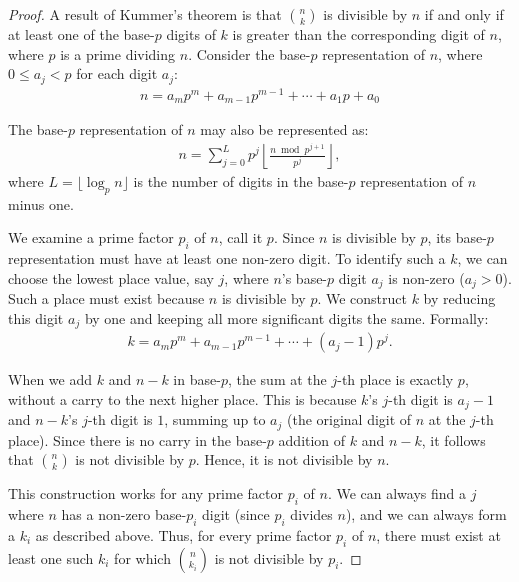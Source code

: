 \documentclass{article}
\theoremstyle{plain}
\theoremstyle{definition}
\begin{document}
\begin{proof}
A result of Kummer's theorem is that \( \binom{n}{k} \) is divisible by \( n \) if and only if at least one of the base-\( p \) digits of \( k \) is greater than the corresponding digit of \( n \), where \( p \) is a prime dividing \( n \). Consider the base-$p$ representation of $n$, where $0 \leq a_j < p$ for each digit $a_j$:
\begin{align}
    n = a_m p^m + a_{m-1} p^{m-1} + \cdots + a_1 p + a_0
\end{align}

The base-$p$ representation of $n$ may also be represented as:
\begin{align}
n = \sum_{j=0}^{L} p^{j} \left\lfloor\frac{n \bmod p^{j+1}}{p^{j}}\right\rfloor,
\end{align}
where \( L = \lfloor \log_p{n} \rfloor \) is the number of digits in the base-\( p \) representation of \( n \) minus one.

We examine a prime factor $p_i$ of $n$, call it $p$. Since $n$ is divisible by $p$, its base-$p$ representation must have at least one non-zero digit. To identify such a $k$, we can choose the lowest place value, say $j$, where $n$'s base-$p$ digit $a_j$ is non-zero ($a_j > 0$). Such a place must exist because $n$ is divisible by $p$. We construct $k$ by reducing this digit $a_j$ by one and keeping all more significant digits the same. Formally:
\begin{align}
    k = a_m p^m + a_{m-1} p^{m-1} + \cdots + (a_j - 1) p^j.
\end{align}

When we add $k$ and $n-k$ in base-$p$, the sum at the $j$-th place is exactly $p$, without a carry to the next higher place. This is because $k$'s $j$-th digit is $a_j - 1$ and $n-k$'s $j$-th digit is $1$, summing up to $a_j$ (the original digit of $n$ at the $j$-th place). Since there is no carry in the base-$p$ addition of $k$ and $n-k$, it follows that $\binom{n}{k}$ is not divisible by $p$. Hence, it is not divisible by $n$.

This construction works for any prime factor $p_i$ of $n$. We can always find a $j$ where $n$ has a non-zero base-$p_i$ digit (since $p_i$ divides $n$), and we can always form a $k_i$ as described above. Thus, for every prime factor $p_i$ of $n$, there must exist at least one such $k_i$ for which $\binom{n}{k_i}$ is not divisible by $p_i$.
\end{proof}
\end{document}

